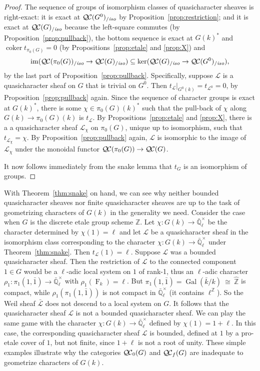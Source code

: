 \documentclass[11pt]{amsart}
\theoremstyle{plain}
\theoremstyle{definition}
\theoremstyle{remark}
\newcommand{\ZZ}{{\mathbb{Z}}}
\newcommand{\EE}{\mathbb{\bar Q}_\ell}
\newcommand{\bFq}{\bar{k}}
\newcommand{\Fq}{k}
\newcommand{\EEx}{\EE^\times}
\DeclareMathOperator{\Gal}{Gal}
\newcommand{\Frob}[1]{\operatorname{F}_{#1}}
\DeclareMathOperator{\coker}{coker}
\newcommand{\iso}{{\ \cong\ }}
\newcommand{\cs}[1]{{\mathcal{#1}}}
\newcommand{\gcs}[1]{{\mathcal{\bar #1}}}
\newcommand{\QC}{{\mathcal{Q\hskip-0.8pt C}}}
\newcommand{\QCb}{{\QC_0}}
\newcommand{\QCf}{{\QC_f}}
\newcommand{\QCiso}[1]{\QC(#1)_{/\textit{iso}}}
\newcommand{\image}{{\operatorname{im}}}
\newcommand{\trFrob}[1]{t_{#1}}
\begin{document}
\begin{proof}
  The sequence of groups of isomorphism classes of quasicharacter sheaves is right-exact: it is exact at
  $\QCiso{G^0}$ by Proposition~\ref{prop:restriction}; and
  it is exact at $\QCiso{G}$ because the left-square
  commutes (by Proposition~\ref{prop:pullback}), the bottom sequence
  is exact at $G(\Fq)^*$ and $\coker \trFrob{\pi_0(G)} =0$
  (by Propositions~\ref{prop:etale} and \ref{prop:X}) and
  \[
  \image(\QCiso{\pi_0(G)} \to \QCiso{G}) \subseteq \ker(\QCiso{G} \to \QCiso{G^0}),
  \]
  by the last part of Proposition~\ref{prop:pullback}. Specifically,
  suppose $\cs{L}$ is a quasicharacter sheaf on $G$ that is trivial on
  $G^0$. Then $\trFrob{\cs{L}}\vert_{G^0(\Fq)} = \trFrob{\cs{L}^0} =0$,
  by Proposition~\ref{prop:pullback} again. Since the sequence of
  character groups is exact at $G(\Fq)^*$, there is
  some $\chi \in \pi_0(G)(\Fq)^*$ such that the
  pull-back of $\chi$ along $G(\Fq)\to \pi_0(G)(\Fq)$ is
  $\trFrob{\cs{L}}$. By Propositions~\ref{prop:etale} and \ref{prop:X},
  there is a a quasicharacter sheaf $\cs{L}_\chi$ on $\pi_0(G)$, unique up
  to isomorphism, such that $\trFrob{\cs{L}_\chi} = \chi$. By
  Proposition~\ref{prop:pullback} again, $\cs{L}$ is isomorphic to the
  image of $\cs{L}_\chi$ under the monoidal functor $\QC(\pi_0(G)) \to \QC(G)$.

  It now follows immediately from the snake lemma that $\trFrob{G}$ is an
  isomorphism of groups.
\end{proof}

With Theorem~\ref{thm:snake} on hand, 
we can see why neither bounded quasicharacter sheaves 
nor finite quasicharacter sheaves are up to the task of 
geometrizing characters of $G(\Fq)$ in the generality we need.  
%
Consider the case when $G$ is the discrete etale group scheme $\ZZ$. 
Let $\chi : G(\Fq) \to \EEx$ be the character determined by $\chi(1) = \ell$ 
and let $\cs{L}$ be a quasicharacter sheaf in the isomorphism class 
corresponding to the character $\chi : G(\Fq) \to \EEx$ under Theorem~\ref{thm:snake}. 
Then $\trFrob{\cs{L}}(1) = \ell$. Suppose $\cs{L}$ was a bounded quasicharacter sheaf. 
Then the restriction of $\cs{L}$ to the connected component $1\in G$ 
would be a $\ell$-adic local system on $1$ of rank-1, 
thus an $\ell$-adic character $\rho_1 : \pi_1(1,{\bar 1}) \to \EEx$ with $\rho_1(\Frob{\Fq}) = \ell$. But $\pi_1(1,{\bar 1}) = \Gal(\bFq/\Fq) \iso {\hat \ZZ}$ is compact, 
while $\rho_1(\pi_1(1,{\bar 1}))$ is not compact in $\EEx$ (it contains $\ell^\ZZ$). 
So the Weil sheaf $\gcs{L}$ does not descend to a local system on $G$.
It follows that the quasicharacter sheaf $\cs{L}$ is not a bounded quasicharacter sheaf.
%
We can play the same game with the character $\chi : G(\Fq) \to \EEx$ 
defined by $\chi(1) = 1+\ell$. In this case, the corresponding quasicharacter sheaf $\cs{L}$ is bounded, defined at $1$ by a pro-etale cover of $1$, but not finite, since $1+\ell$ is not a root of unity. 
%
These simple examples illustrate why the categories $\QCb(G)$ and $\QCf(G)$ are inadequate to geometrize characters of $G(\Fq)$.
\end{document}

